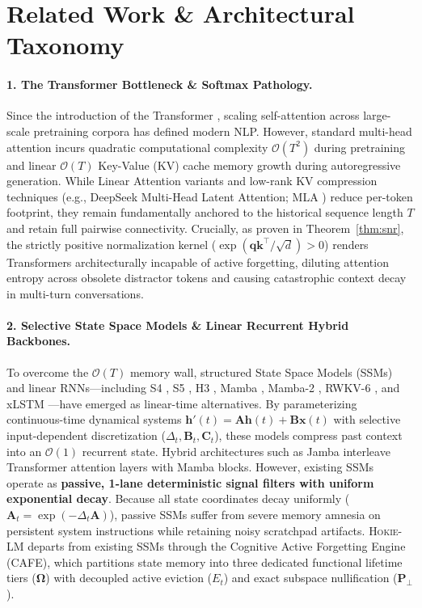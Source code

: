 \section{Related Work \& Architectural Taxonomy}
\label{sec:related_work}

\paragraph{1. The Transformer Bottleneck \& Softmax Pathology.}
Since the introduction of the Transformer \citep{vaswani2017attention}, scaling self-attention across large-scale pretraining corpora has defined modern NLP. 
However, standard multi-head attention incurs quadratic computational complexity $\mathcal{O}(T^2)$ during pretraining and linear $\mathcal{O}(T)$ Key-Value (KV) cache memory growth during autoregressive generation. 
While Linear Attention variants \citep{katharopoulos2020transformers} and low-rank KV compression techniques (e.g., DeepSeek Multi-Head Latent Attention; MLA \citep{deepseek2024v3}) reduce per-token footprint, they remain fundamentally anchored to the historical sequence length $T$ and retain full pairwise connectivity. 
Crucially, as proven in Theorem~\ref{thm:snr}, the strictly positive normalization kernel ($\exp(\mathbf{q}\mathbf{k}^\top/\sqrt{d}) > 0$) renders Transformers architecturally incapable of active forgetting, diluting attention entropy across obsolete distractor tokens and causing catastrophic context decay in multi-turn conversations.

\paragraph{2. Selective State Space Models \& Linear Recurrent Hybrid Backbones.}
To overcome the $\mathcal{O}(T)$ memory wall, structured State Space Models (SSMs) and linear RNNs—including S4 \citep{gu2022efficiently}, S5 \citep{smith2022simplified}, H3 \citep{fu2022hungry}, Mamba \citep{gu2023mamba}, Mamba-2 \citep{dao2024transformers}, RWKV-6 \citep{peng2023rwkv}, and xLSTM \citep{beck2024xlstm}—have emerged as linear-time alternatives. 
By parameterizing continuous-time dynamical systems $\mathbf{h}'(t) = \mathbf{A}\mathbf{h}(t) + \mathbf{B}\mathbf{x}(t)$ with selective input-dependent discretization ($\Delta_t, \mathbf{B}_t, \mathbf{C}_t$), these models compress past context into an $\mathcal{O}(1)$ recurrent state. 
Hybrid architectures such as Jamba \citep{lieber2024jamba} interleave Transformer attention layers with Mamba blocks. 
However, existing SSMs operate as \textbf{passive, 1-lane deterministic signal filters with uniform exponential decay}. 
Because all state coordinates decay uniformly ($\mathbf{A}_t = \exp(-\Delta_t \mathbf{A})$), passive SSMs suffer from severe memory amnesia on persistent system instructions while retaining noisy scratchpad artifacts. 
\textsc{Hokie-LM} departs from existing SSMs through the Cognitive Active Forgetting Engine (CAFE), which partitions state memory into three dedicated functional lifetime tiers ($\boldsymbol{\Omega}$) with decoupled active eviction ($E_t$) and exact subspace nullification ($\mathbf{P}_\perp$).

